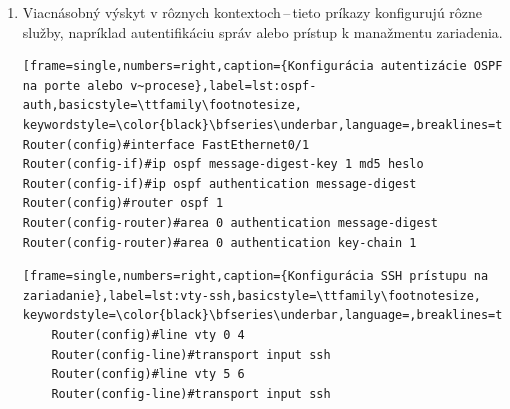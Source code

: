 \begin{enumerate}
\begin{minipage}{\linewidth}		
\begin{lstlisting}[frame=single,numbers=right,caption={Konfigurácia maximálneho počtu povolených MAC adries na porte},label=lst:mac-max,basicstyle=\ttfamily\footnotesize, keywordstyle=\color{black}\bfseries\underbar,language=,breaklines=true]
Router(config)#interface FastEthernet0/1
Router(config-if)#switchport port-security mac address max 1
Router(config)#interface FastEthernet0/4
Router(config-if)#switchport port-security mac address max 2
Router(config)#interface FastEthernet1/1
Router(config-if)#switchport port-security mac address max 1
\end{lstlisting}
\end{minipage}

	\item \vspace{2em} Viacnásobný výskyt v rôznych kontextoch\,--\,tieto príkazy konfigurujú rôzne služby, napríklad autentifikáciu správ  alebo prístup k manažmentu zariadenia.

\begin{minipage}{\linewidth}		
\begin{lstlisting}[frame=single,numbers=right,caption={Konfigurácia autentizácie OSPF na porte alebo v~procese},label=lst:ospf-auth,basicstyle=\ttfamily\footnotesize, keywordstyle=\color{black}\bfseries\underbar,language=,breaklines=true]
Router(config)#interface FastEthernet0/1
Router(config-if)#ip ospf message-digest-key 1 md5 heslo
Router(config-if)#ip ospf authentication message-digest
Router(config)#router ospf 1
Router(config-router)#area 0 authentication message-digest
Router(config-router)#area 0 authentication key-chain 1
\end{lstlisting}
\end{minipage}
	
\begin{minipage}{\linewidth}		
	\begin{lstlisting}[frame=single,numbers=right,caption={Konfigurácia SSH prístupu na zariadanie},label=lst:vty-ssh,basicstyle=\ttfamily\footnotesize, keywordstyle=\color{black}\bfseries\underbar,language=,breaklines=true]
	Router(config)#line vty 0 4
	Router(config-line)#transport input ssh
	Router(config)#line vty 5 6
	Router(config-line)#transport input ssh
	\end{lstlisting}
\end{minipage}	
	
		
\end{enumerate}
\newpage
